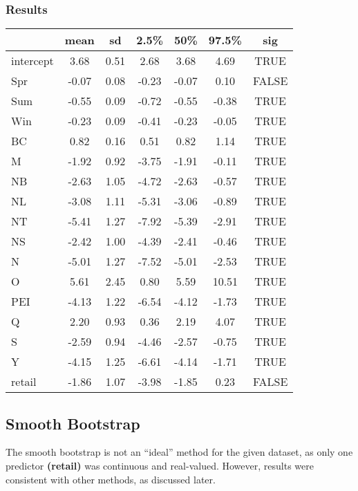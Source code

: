 \documentclass[12pt]{article}
\begin{document}
\subsubsection*{Results}
\begin{table}[hbt!]
    \centering
    \begin{tabular}{|l|c|c|c|c|c|c|}
      \hline
     & mean & sd & 2.5\% & 50\% & 97.5\% & sig \\ 
      \hline
    intercept & 3.68 & 0.51 & 2.68 & 3.68 & 4.69 & TRUE \\ 
      Spr & -0.07 & 0.08 & -0.23 & -0.07 & 0.10 & FALSE \\ 
      Sum & -0.55 & 0.09 & -0.72 & -0.55 & -0.38 & TRUE \\ 
      Win & -0.23 & 0.09 & -0.41 & -0.23 & -0.05 & TRUE \\ 
      BC & 0.82 & 0.16 & 0.51 & 0.82 & 1.14 & TRUE \\ 
      M & -1.92 & 0.92 & -3.75 & -1.91 & -0.11 & TRUE \\ 
      NB & -2.63 & 1.05 & -4.72 & -2.63 & -0.57 & TRUE \\ 
      NL & -3.08 & 1.11 & -5.31 & -3.06 & -0.89 & TRUE \\ 
      NT & -5.41 & 1.27 & -7.92 & -5.39 & -2.91 & TRUE \\ 
      NS & -2.42 & 1.00 & -4.39 & -2.41 & -0.46 & TRUE \\ 
      N & -5.01 & 1.27 & -7.52 & -5.01 & -2.53 & TRUE \\ 
      O & 5.61 & 2.45 & 0.80 & 5.59 & 10.51 & TRUE \\ 
      PEI & -4.13 & 1.22 & -6.54 & -4.12 & -1.73 & TRUE \\ 
      Q & 2.20 & 0.93 & 0.36 & 2.19 & 4.07 & TRUE \\ 
      S & -2.59 & 0.94 & -4.46 & -2.57 & -0.75 & TRUE \\ 
      Y & -4.15 & 1.25 & -6.61 & -4.14 & -1.71 & TRUE \\ 
      retail & -1.86 & 1.07 & -3.98 & -1.85 & 0.23 & FALSE \\ 
       \hline
    \end{tabular}
\end{table}
\subsection{Smooth Bootstrap}
The smooth bootstrap is not an ``ideal'' method for the given dataset, as only one predictor \textbf{(retail)} was continuous and real-valued. However, results were consistent with other methods, as discussed later.
\end{document}
